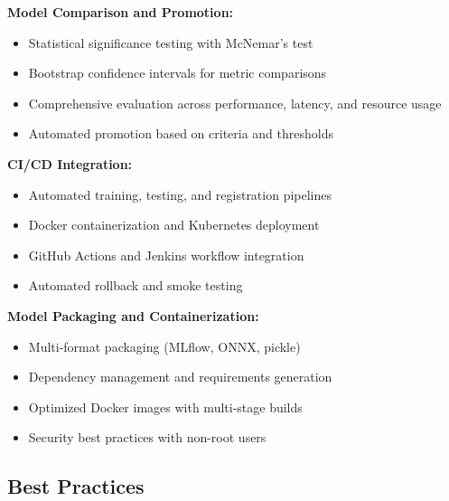 \textbf{Model Comparison and Promotion:}
\begin{itemize}
    \item Statistical significance testing with McNemar's test
    \item Bootstrap confidence intervals for metric comparisons
    \item Comprehensive evaluation across performance, latency, and resource usage
    \item Automated promotion based on criteria and thresholds
\end{itemize}

\textbf{CI/CD Integration:}
\begin{itemize}
    \item Automated training, testing, and registration pipelines
    \item Docker containerization and Kubernetes deployment
    \item GitHub Actions and Jenkins workflow integration
    \item Automated rollback and smoke testing
\end{itemize}

\textbf{Model Packaging and Containerization:}
\begin{itemize}
    \item Multi-format packaging (MLflow, ONNX, pickle)
    \item Dependency management and requirements generation
    \item Optimized Docker images with multi-stage builds
    \item Security best practices with non-root users
\end{itemize}

\subsection{Best Practices}

